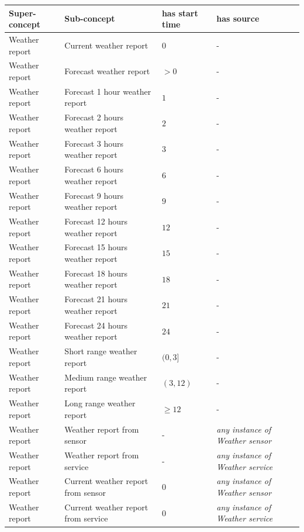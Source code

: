 \begin{longtable}{|p{}|p{}|p{}|p{}|}
  \hline
  \textbf{Super-concept} & \textbf{Sub-concept} & \textbf{has start time} & \textbf{has source} \\
  \hline\hline
  Weather report & Current weather report & $0$ & - \\
  \hline
  Weather report & Forecast weather report & $> 0$ & - \\
  \hline
  Weather report & Forecast 1 hour weather report & $1$ & - \\
  \hline
  Weather report & Forecast 2 hours weather report & $2$ & - \\
  \hline
  Weather report & Forecast 3 hours weather report & $3$ & - \\
  \hline
  Weather report & Forecast 6 hours weather report & $6$ & - \\
  \hline
  Weather report & Forecast 9 hours weather report & $9$ & - \\
  \hline
  Weather report & Forecast 12 hours weather report & $12$ & - \\
  \hline
  Weather report & Forecast 15 hours weather report & $15$ & - \\
  \hline
  Weather report & Forecast 18 hours weather report & $18$ & - \\
  \hline
  Weather report & Forecast 21 hours weather report & $21$ & - \\
  \hline
  Weather report & Forecast 24 hours weather report & $24$ & - \\
  \hline
  Weather report & Short range weather report & $(0, 3]$ & - \\
  \hline
  Weather report & Medium range weather report & $(3, 12)$ & - \\
  \hline
  Weather report & Long range weather report & $\geq 12$ & - \\
  \hline
  Weather report & Weather report from sensor & - & \emph{any instance of Weather sensor} \\
  \hline
  Weather report & Weather report from service & - & \emph{any instance of Weather service} \\
  \hline
  Weather report & Current weather report from sensor & $0$ & \emph{any instance of Weather sensor} \\
  \hline
  Weather report & Current weather report from service & $0$ & \emph{any instance of Weather service} \\
  \hline
\end{longtable}

